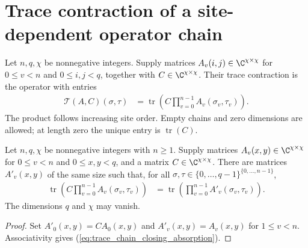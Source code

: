 \section{Trace contraction of a site-dependent operator chain}

\begin{definition}
    \label{def:trace_chain_operator}
    \leanok
    Let $n,q,\chi$ be nonnegative integers. Supply matrices
    $A_v(i,j)\in\C^{\chi\times\chi}$ for $0\le v<n$ and $0\le i,j<q$,
    together with $C\in\C^{\chi\times\chi}$. Their trace contraction is
    the operator with entries
    \begin{align}
        \mathcal T(A,C)(\sigma,\tau)
         & =\operatorname{tr}\left(C\prod_{v=0}^{n-1}A_v(\sigma_v,\tau_v)\right).
        \label{eq:trace_chain_operator}
    \end{align}
    The product follows increasing site order. Empty chains and zero
    dimensions are allowed; at length zero the unique entry is
    $\operatorname{tr}(C)$.
\end{definition}

\begin{lemma}
    \label{thm:trace_chain_closing_absorption}
    \leanok
    Let $n,q,\chi$ be nonnegative integers with $n\ge1$.
    Supply matrices $A_v(x,y)\in\C^{\chi\times\chi}$ for
    $0\le v<n$ and $0\le x,y<q$, and a matrix
    $C\in\C^{\chi\times\chi}$.
    There are matrices $A'_v(x,y)$ of the same size such that, for all
    $\sigma,\tau\in\{0,\ldots,q-1\}^{\{0,\ldots,n-1\}}$,
    \begin{align}
        \operatorname{tr}\left(C\prod_{v=0}^{n-1}A_v(\sigma_v,\tau_v)\right)
         & =\operatorname{tr}\left(\prod_{v=0}^{n-1}A'_v(\sigma_v,\tau_v)\right).
        \label{eq:trace_chain_closing_absorption}
    \end{align}
    The dimensions $q$ and $\chi$ may vanish.
\end{lemma}
\begin{proof}\leanok
    Set $A'_0(x,y)=CA_0(x,y)$ and $A'_v(x,y)=A_v(x,y)$ for $1\le v<n$.
    Associativity gives (\ref{eq:trace_chain_closing_absorption}).
\end{proof}

